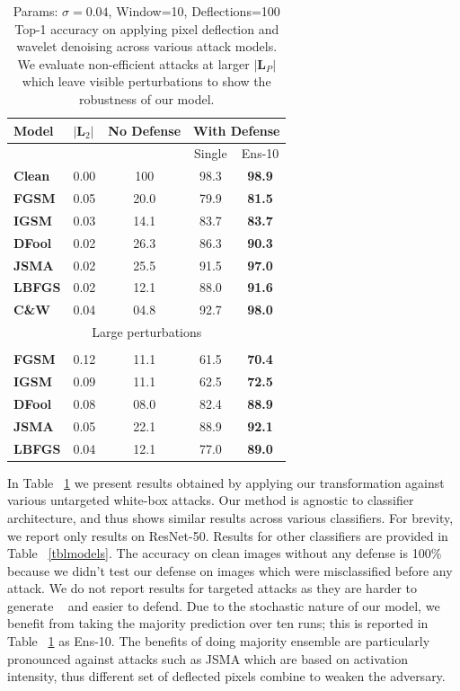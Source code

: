 \begin{table}[H]
\centering
{}
\begin{tabular}{lcccc}
\textbf{Model} & \multicolumn{1}{l}{$|\boldsymbol{L}_2|$} & \multicolumn{1}{l}{\textbf{No Defense}} & \multicolumn{2}{l}{\textbf{With Defense}} \\ \hline
 & \multicolumn{1}{l}{} & \multicolumn{1}{l}{} & Single & Ens-10 \\ \cline{4-5} 
 \textbf{Clean} & 0.00 & 100 & 98.3 & \textbf{98.9} \\ \hline
\textbf{FGSM} & 0.05 & 20.0 & 79.9 & \textbf{81.5} \\
\textbf{IGSM} & 0.03 & 14.1 & 83.7 & \textbf{83.7} \\
\textbf{DFool} & 0.02 & 26.3 & 86.3 & \textbf{90.3} \\
\textbf{JSMA} & 0.02 & 25.5 & 91.5 & \textbf{97.0} \\
\textbf{LBFGS} & 0.02 & 12.1 & 88.0 & \textbf{91.6} \\
\textbf{C\&W} & 0.04 & 04.8 & 92.7 & \textbf{98.0}
\\
 \multicolumn{5}{c}{Large perturbations} \\ \hline
 &&&&\\
\textbf{FGSM} & 0.12 & 11.1 & 61.5 &  \textbf{70.4}\\
\textbf{IGSM} & 0.09 & 11.1 & 62.5 &  \textbf{72.5}\\
\textbf{DFool} & 0.08 & 08.0 & 82.4 &  \textbf{88.9}\\
\textbf{JSMA} & 0.05 & 22.1 & 88.9 &  \textbf{92.1}\\
\textbf{LBFGS} & 0.04 & 12.1 & 77.0 & \textbf{89.0} \\
\end{tabular}
\caption[Classification Accuracy with Pixel Deflection]{ Params: $\sigma=0.04$, Window=10, Deflections=100 \\Top-1 accuracy on applying pixel deflection and wavelet denoising across various attack models. We evaluate non-efficient attacks at larger $|\bm{L}_P|$ which leave visible perturbations to show the robustness of our model.
 \label{tblresults}}
\end{table}
In Table ~\ref{tblresults} we present results obtained by applying our transformation against various untargeted white-box attacks. 
Our method is agnostic to classifier architecture, and thus shows similar results across various classifiers. 
For brevity, we report only results on ResNet-50. 
Results for other classifiers are provided in Table ~\ref{tblmodels}.
The accuracy on clean images without any defense is 100\% because we didn't test our defense on images which were misclassified before any attack.
We do not report results for targeted attacks as they are harder to generate ~\cite{Carlini2017TowardsET} and easier to defend. 
Due to the stochastic nature of our model, we benefit from taking the majority prediction over ten runs; this is reported in Table ~\ref{tblresults} as Ens-10.
The benefits of doing majority ensemble are particularly pronounced against attacks such as JSMA which are based on activation intensity, thus different set of deflected pixels combine to weaken the adversary.

